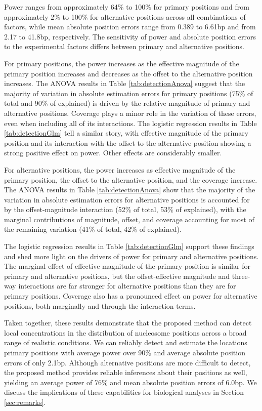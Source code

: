 Power ranges from approximately 64\% to 100\% for primary positions and from approximately 2\% to 100\% for alternative positions across all combinations of factors, while mean absolute position errors range from 0.389 to 6.61bp and from 2.17 to 41.8bp, respectively.
The sensitivity of power and absolute position errors to the experimental factors differs between primary and alternative positions.

For primary positions, the power increases as the effective magnitude of the primary position increases and decreases as the offset to the alternative position increases.
The ANOVA results in Table \ref{tab:detectionAnova} suggest that the majority of variation in absolute estimation errors for primary positions (75\% of total and 90\% of explained) is driven by the relative magnitude of primary and alternative positions.
Coverage plays a minor role in the variation of these errors, even when including all of its interactions.
The logistic regression results in Table \ref{tab:detectionGlm} tell a similar story, with effective magnitude of the primary position and its interaction with the offset to the alternative position showing a strong positive effect on power.
Other effects are considerably smaller.

For alternative positions, the power increases as effective magnitude of the primary position, the offset to the alternative position, and the coverage increase.
The ANOVA results in Table \ref{tab:detectionAnova} show that the majority of the variation in absolute estimation errors for alternative positions is accounted for by the offset-magnitude interaction (52\% of total, 53\% of explained), with the marginal contributions of magnitude, offset, and coverage accounting for most of the remaining variation (41\% of total, 42\% of explained).

The logistic regression results in Table \ref{tab:detectionGlm} support these findings and shed more light on the drivers of power for primary and alternative positions.
The marginal effect of effective magnitude of the primary position is similar for primary and alternative positions, but the offset-effective magnitude and three-way interactions are far stronger for alternative positions than they are for primary positions.
Coverage also has a pronounced effect on power for alternative positions, both marginally and through the interaction terms.

Taken together, these results demonstrate that the proposed method can detect local concentrations in the distribution of nucleosome positions across a broad range of realistic conditions.
We can reliably detect and estimate the locations primary positions with average power over 90\% and average absolute position errors of only 2.1bp.
Although alternative positions are more difficult to detect, the proposed method provides reliable inferences about their positions as well, yielding an average power of 76\% and mean absolute position errors of 6.0bp.
We discuss the implications of these capabilities for biological analyses in Section \ref{sec:remarks}.

